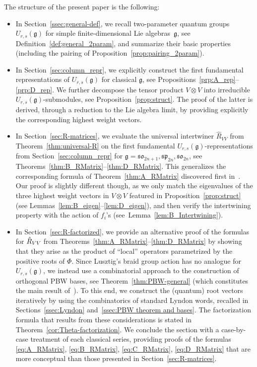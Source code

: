 \documentclass[pdftex]{sigma}
\numberwithin{equation}{section}
\newcommand{\fg}{\mathfrak{g}}
\newcommand{\sso}{\mathfrak{so}}
\newcommand{\ssp}{\mathfrak{sp}}
\newcommand{\uu}{U_{r,s}(\fg)}
\begin{document}
The structure of the present paper is the following:
\begin{itemize}\itemsep=0pt
\item[$\bullet$]
In Section~\ref{ssec:general-def}, we recall  two-parameter quantum groups $U_{r,s}(\fg)$ for simple finite-dimen\-sional Lie algebras~$\fg$, see Definition~\ref{def:general_2param}, and summarize their basic properties (including the pairing of Proposition~\ref{prop:pairing_2param}).


\item[$\bullet$]
In Section~\ref{sec:column_repr}, we explicitly construct the first fundamental representations of $U_{r,s}(\fg)$ for classical $\fg$, see Propositions~\ref{prp:A_rep}--\ref{prp:D_rep}. We further decompose the tensor product $V\otimes V$ into irreducible $U_{r,s}(\fg)$-submodules, see Proposition~\ref{prop:struct}. The proof of the latter is derived, through a reduction to the Lie algebra limit, by providing explicitly the corresponding highest weight vectors.

\item[$\bullet$]
In Section~\ref{sec:R-matrices}, we evaluate the universal intertwiner $\hat{R}_{VV}$ from Theorem~\ref{thm:universal-R} on the first fundamental $\uu$-representations from Section~\ref{sec:column_repr} for $\fg=\sso_{2n+1},\ssp_{2n},\sso_{2n}$, see Theorems~\ref{thm:B_RMatrix}--\ref{thm:D_RMatrix}. This generalizes the corresponding formula of Theorem~\ref{thm:A_RMatrix} discovered first in~\cite{BW2}. Our proof is slightly different though, as we only match the eigenvalues of the three highest weight vectors in $V\otimes V$ featured in Proposition~\ref{prop:struct} (see Lemmas~\ref{lem:B_eigen}--\ref{lem:D_eigen}), and then verify the intertwining property with the action of $f_i$'s (see~Lemma~\ref{lem:B_Intertwining}).

\item[$\bullet$]
In Section~\ref{sec:R-factorized}, we provide an alternative proof of the formulas for $\hat{R}_{VV}\hspace{-0.67pt}$ from Theorems~\mbox{\ref{thm:A_RMatrix}--\ref{thm:D_RMatrix}} by showing that they arise as the product of ``local'' operators parametrized by the positive roots of $\Phi$. Since Lusztig's braid group action has no analogue for $\uu$, we instead use a combinatorial approach to the construction of orthogonal PBW bases, see Theorem~\ref{thm:PBW-general} (which constitutes the main result of~\cite{MT1}). To this end, we construct the (quantum) root vectors iteratively by using the combinatorics of standard Lyndon words, recalled in Sections~\ref{ssec:Lyndon} and~\ref{ssec:PBW theorem and bases}. The factorization formula that results from these considerations is stated in Theorem~\ref{cor:Theta-factorization}. We conclude the section with a case-by-case treatment of each classical series, providing proofs of the formulas \eqref{eq:A_RMatrix}, \eqref{eq:B_RMatrix}, \eqref{eq:C_RMatrix}, \eqref{eq:D_RMatrix} that are more conceptual than those presented in Section~\ref{sec:R-matrices}.


\end{itemize}
\end{document}
